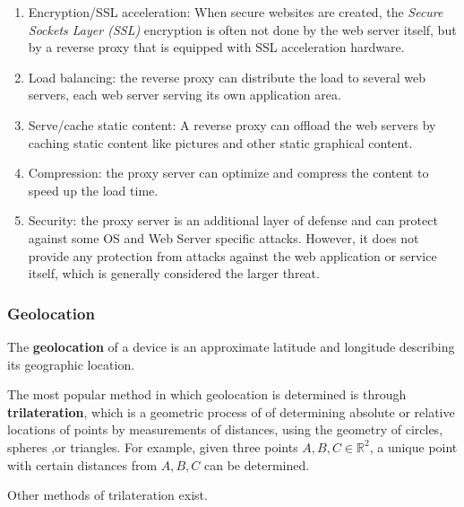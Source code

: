 \documentclass{article}
\newcounter{definition}[section]
\newcounter{example}[section]
\begin{document}
\begin{definition}
\begin{enumerate}
      \begin{enumerate}
          \item Encryption/SSL acceleration: When secure websites are created, the \textit{Secure Sockets Layer (SSL)} encryption is often not done by the web server itself, but by a reverse proxy that is equipped with SSL acceleration hardware. 
          \item Load balancing: the reverse proxy can distribute the load to several web servers, each web server serving its own application area. 
          \item Serve/cache static content: A reverse proxy can offload the web servers by caching static content like pictures and other static graphical content.
          \item Compression: the proxy server can optimize and compress the content to speed up the load time.
          \item Security: the proxy server is an additional layer of defense and can protect against some OS and Web Server specific attacks. However, it does not provide any protection from attacks against the web application or service itself, which is generally considered the larger threat.
      \end{enumerate}
  \end{enumerate}
  \end{definition}

  \subsubsection{Geolocation}

  \begin{definition}[Geolocation]
    \label{def:geolocation}
  The \textbf{geolocation} of a device is an approximate latitude and longitude describing its geographic location. 
  \end{definition}

  \begin{definition}[Trilateration]
    \label{def:trilateration}
  The most popular method in which geolocation is determined is through \textbf{trilateration}, which is a geometric process of of determining absolute or relative locations of points by measurements of distances, using the geometry of circles, spheres ,or triangles. For example, given three points $A, B, C \in \mathbb{R}^2$, a unique point with certain distances from $A, B, C$ can be determined. 
  \begin{center}
  \end{center}
  Other methods of trilateration exist. 
  \end{definition}
\end{document}

